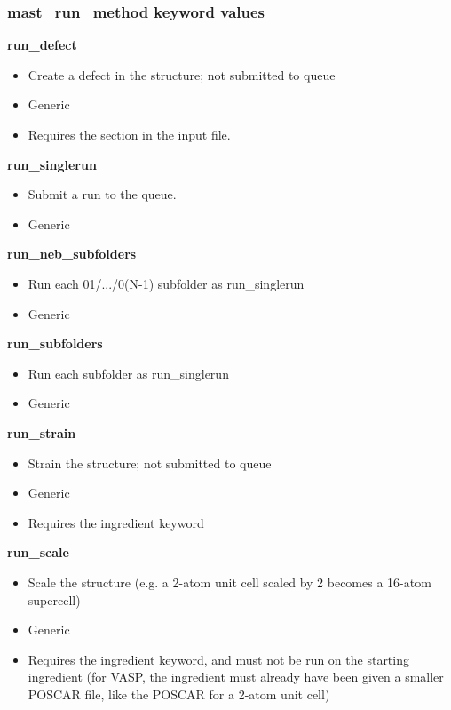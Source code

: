 \documentclass[letterpaper,10pt,english]{sphinxmanual}
\begin{document}
\subsubsection{mast\_run\_method keyword values}
\label{3_0_inputfile:mast-run-method-keyword-values}
\textbf{run\_defect}
\begin{itemize}
\item {} 
Create a defect in the structure; not submitted to queue

\item {} 
Generic

\item {} 
Requires the  section in the input file.

\end{itemize}

\textbf{run\_singlerun}
\begin{itemize}
\item {} 
Submit a run to the queue.

\item {} 
Generic

\end{itemize}

\textbf{run\_neb\_subfolders}
\begin{itemize}
\item {} 
Run each 01/.../0(N-1) subfolder as run\_singlerun

\item {} 
Generic

\end{itemize}

\textbf{run\_subfolders}
\begin{itemize}
\item {} 
Run each subfolder as run\_singlerun

\item {} 
Generic

\end{itemize}

\textbf{run\_strain}
\begin{itemize}
\item {} 
Strain the structure; not submitted to queue

\item {} 
Generic

\item {} 
Requires the  ingredient keyword

\end{itemize}

\textbf{run\_scale}
\begin{itemize}
\item {} 
Scale the structure (e.g. a 2-atom unit cell scaled by 2 becomes a 16-atom supercell)

\item {} 
Generic

\item {} 
Requires the  ingredient keyword, and must not be run on the starting ingredient (for VASP, the ingredient must already have been given a smaller POSCAR file, like the POSCAR for a 2-atom unit cell)

\end{itemize}
\end{document}
